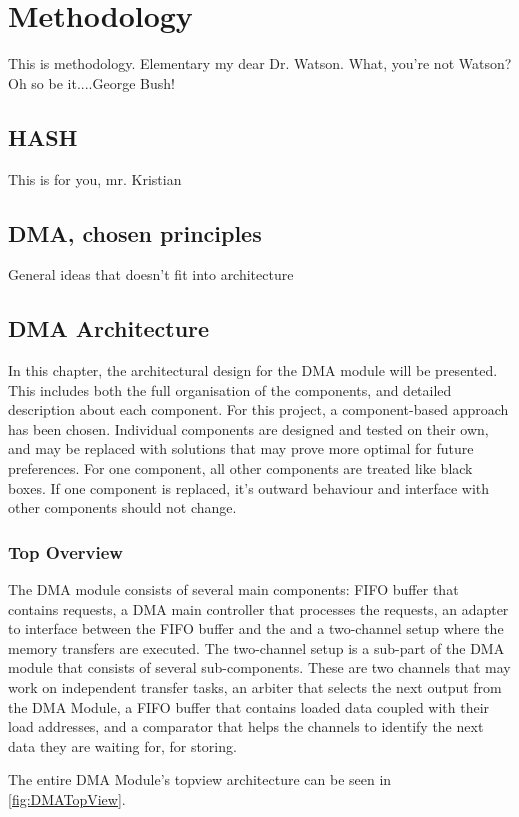 \chapter{Methodology}
This is methodology. 
Elementary my dear Dr. Watson. 
What, you're not Watson?
Oh so be it....George Bush!

\section{HASH}
This is for you, mr. Kristian

\section{DMA, chosen principles}
General ideas that doesn't fit into architecture


\section{DMA Architecture}
In this chapter, the architectural design for the DMA module will be presented.
This includes both the full organisation of the components, and detailed description about each component. 
For this project, a component-based approach has been chosen.
Individual components are designed and tested on their own, and may be replaced with solutions that may prove more optimal for future preferences.
For one component, all other components are treated like black boxes.
If one component is replaced, it's outward behaviour and interface with other components should not change.

\subsection{Top Overview}
The DMA module consists of several main components: FIFO buffer that contains requests, a DMA main controller that processes the requests, an adapter to interface between the FIFO buffer and the and a two-channel setup where the memory transfers are executed. 
The two-channel setup is a sub-part of the DMA module that consists of several sub-components.
These are two channels that may work on independent transfer tasks, an arbiter that selects the next output from the DMA Module, a FIFO buffer that contains loaded data coupled with their load addresses, and a comparator that helps the channels to identify the next data they are waiting for, for storing.

The entire DMA Module's topview architecture can be seen in 
\ref{fig:DMATopView}.


